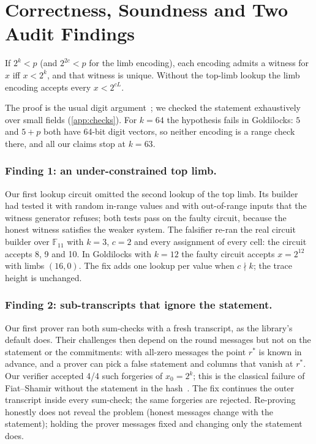 \section{Correctness, Soundness and Two Audit Findings}\label{sec:security}

\begin{lemma}\label{lem:gadgets}
If $2^k < p$ (and $2^{2c} < p$ for the limb encoding), each encoding admits a witness for $x$ iff $x < 2^k$, and
that witness is unique. Without the top-limb lookup the limb encoding accepts every $x < 2^{cL}$.
\end{lemma}
The proof is the usual digit argument~\cite[§6.5.4]{Thaler}; we checked the statement exhaustively over small
fields (\cref{app:checks}). For $k = 64$ the hypothesis fails in Goldilocks: $5$ and $5 + p$ both have 64-bit
digit vectors, so neither encoding is a range check there, and all our claims stop at $k = 63$.

\subsubsection{Finding 1: an under-constrained top limb.} Our first lookup circuit omitted the second lookup of the
top limb. Its builder had tested it with random in-range values and with out-of-range inputs that the witness
generator refuses; both tests pass on the faulty circuit, because the honest witness satisfies the weaker system.
The falsifier re-ran the real circuit builder over $\mathbb{F}_{11}$ with $k = 3$, $c = 2$ and every assignment
of every cell: the circuit accepts 8, 9 and 10. In Goldilocks with $k = 12$ the faulty circuit accepts
$x = 2^{12}$ with limbs $(16, 0)$. The fix adds one lookup per value when $c \nmid k$; the trace height is
unchanged.

\subsubsection{Finding 2: sub-transcripts that ignore the statement.} Our first prover ran both sum-checks with a
fresh transcript, as the library's default does. Their challenges then depend on the round messages but not on
the statement or the commitments: with all-zero messages the point $r^*$ is known in advance, and a prover can
pick a false statement and columns that vanish at $r^*$. Our verifier accepted 4/4 such forgeries of
$x_0 = 2^k$; this is the classical failure of Fiat--Shamir without the statement in the
hash~\cite{BPW12,CY24}. The fix continues the outer transcript inside every sum-check; the same forgeries are
rejected. Re-proving honestly does not reveal the problem (honest messages change with the statement); holding
the prover messages fixed and changing only the statement does.


